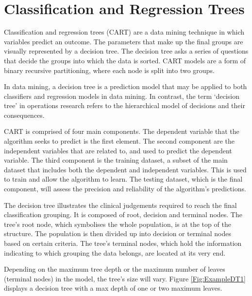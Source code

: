 \documentclass[../thesis.tex]{subfiles}
\begin{document}
\section{Classification and Regression Trees}\label{sec:CART}
Classification and regression trees (CART) are a data mining technique in which variables predict an outcome. The parameters that make up the final groups are visually represented by a decision tree. The decision tree asks a series of questions that decide the groups into which the data is sorted. CART models are a form of binary recursive partitioning, where each node is split into two groups.

In data mining, a decision tree is a prediction model that may be applied to both classifiers and regression models in data mining. In contrast, the term `decision tree' in operations research refers to the hierarchical model of decisions and their consequences.

CART is comprised of four main components. The dependent variable that the algorithm seeks to predict is the first element. The second component are the independent variables that are related to, and used to predict the dependent variable. The third component is the training dataset, a subset of the main dataset that includes both the dependent and independent variables. This is used to train and allow the algorithm to learn. The testing dataset, which is the final component, will assess the precision and reliability of the algorithm's predictions.

The decision tree illustrates the clinical judgements required to reach the final classification grouping. It is composed of root, decision and terminal nodes. The tree's root node, which symbolises the whole population, is at the top of the structure. The population is then divided up into decision or terminal nodes based on certain criteria. The tree's terminal nodes, which hold the information indicating to which grouping the data belongs, are located at its very end.

Depending on the maximum tree depth or the maximum number of leaves (terminal nodes) in the model, the tree's size will vary. Figure \ref{Fig:ExampleDT1} displays a decision tree with a max depth of one or two maximum leaves.
\end{document}
